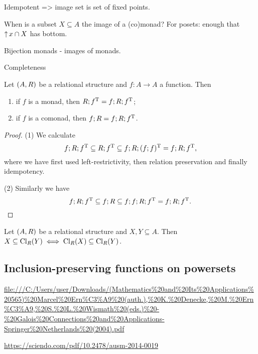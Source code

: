 Idempotent => image set is set of fixed points.

\begin{proposition}
When is a subset $X\subseteq A$ the image of a (co)monad? For posets: enough that $\operatorname{\uparrow} x \cap X$ has bottom.
\end{proposition}

\begin{proposition}
Bijection monads - images of monads.
\end{proposition}

\begin{definition}
Completeness
\end{definition}

\begin{proposition}
Let $\sSet{A,R}$ be a relational structure and $f: A\to A$ a function. Then
\begin{enumerate}
\item if $f$ is a monad, then $R; f^{\mathrm{T}} = f;R;f^{\mathrm{T}}$;
\item if $f$ is a comonad, then $f;R = f;R;f^{\mathrm{T}}$.
\end{enumerate}
\end{proposition}
\begin{proof}
(1) We calculate
\[ f;R;f^{\mathrm{T}} \subseteq R;f^{\mathrm{T}} \subseteq f;R;(f;f)^{\mathrm{T}} = f;R;f^{\mathrm{T}}, \]
where we have first used left-restrictivity, then relation preservation and finally idempotency.

(2) Similarly we have
\[ f;R;f^{\mathrm{T}} \subseteq f;R \subseteq f;f;R;f^{\mathrm{T}} = f;R;f^{\mathrm{T}}. \]
\end{proof}
\begin{corollary} \label{closureInclusionLemma}
Let $\sSet{A,R}$ be a relational structure and $X,Y\subseteq A$. Then $X\subseteq \operatorname{Cl}_R(Y) \iff \operatorname{Cl}_R(X)\subseteq \operatorname{Cl}_R(Y)$.
\end{corollary}

\subsection{Inclusion-preserving functions on powersets}
\url{file:///C:/Users/user/Downloads/(Mathematics%20and%20Its%20Applications%20565)%20Marcel%20Ern%C3%A9%20(auth.),%20K.%20Denecke,%20M.%20Ern%C3%A9,%20S.%20L.%20Wismath%20(eds.)%20-%20Galois%20Connections%20and%20Applications-Springer%20Netherlands%20(2004).pdf}

\url{https://sciendo.com/pdf/10.2478/ausm-2014-0019}


